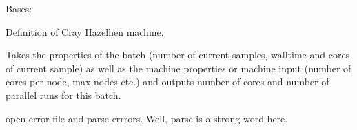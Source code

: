 \documentclass[letterpaper,10pt,english]{sphinxmanual}
\begin{document}
\begin{fulllineitems}
\label{\detokenize{machine:machine.cray.Cray}}
Bases: {\hyperref[\detokenize{machine:machine.machine.Machine}]{}}

Definition of Cray Hazelhen machine.

\begin{fulllineitems}
\label{\detokenize{machine:machine.cray.Cray.allocate_resources}}
Takes the properties of the batch (number of current samples,
walltime and cores of current sample) as well as the machine 
properties or machine input (number of cores per node, max nodes
etc.) and outputs number of cores and number of parallel runs 
for this batch.

\end{fulllineitems}


\begin{fulllineitems}
\label{\detokenize{machine:machine.cray.Cray.check_errorfile}}
open error file and parse errrors. 
Well, parse is a strong word here.

\end{fulllineitems}


\begin{fulllineitems}
\label{\detokenize{machine:machine.cray.Cray.defaults_}}
\end{fulllineitems}



\end{fulllineitems}
\end{document}
